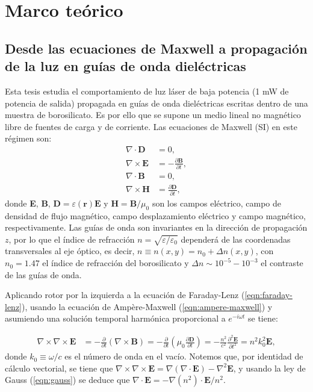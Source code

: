 \chapter{Marco teórico}

\section{Desde las ecuaciones de Maxwell a propagación de la luz en guías de onda dieléctricas}

Esta tesis estudia el comportamiento de luz láser de baja potencia (1 mW de potencia de salida) propagada en guías de onda dieléctricas escritas dentro de una muestra de borosilicato. Es por ello que se supone un medio lineal no magnético libre de fuentes de carga y de corriente. Las ecuaciones de Maxwell (SI) en este régimen son:
\begin{align}
	\nabla\cdot\textbf{D} &= 0, \label{eqn:gauss}
	\\	
	\nabla\times\textbf{E} &= -\frac{\partial \textbf{B}}{\partial t}, \label{eqn:faraday-lenz}
	\\	
	\nabla\cdot\textbf{B} &= 0, \label{eqn:div0}
	\\	
	\nabla\times\textbf{H} &= \frac{\partial \textbf{D}}{\partial t}, \label{eqn:ampere-maxwell}
\end{align}
donde \textbf{E}, \textbf{B}, $\textbf{D}=\varepsilon(\textbf{r})\textbf{E}$ y $\textbf{H}=\textbf{B}/\mu_0$ son los campos eléctrico, campo de densidad de flujo magnético, campo desplazamiento eléctrico y campo magnético, respectivamente. Las guías de onda son invariantes en la dirección de propagación $z$, por lo que el índice de refracción $n=\sqrt{\varepsilon/\varepsilon_0}$ dependerá de las coordenadas transversales al eje óptico, es decir, $n \equiv n(x,y) = n_0 + \Delta n(x,y)$, con $n_0=1.47$ el índice de refracción del borosilicato y $\Delta n \sim 10^{-5}-10^{-3}$ el contraste de las guías de onda.

Aplicando rotor por la izquierda a la ecuación de Faraday-Lenz (\ref{eqn:faraday-lenz}), usando la ecuación de Ampère-Maxwell (\ref{eqn:ampere-maxwell}) y asumiendo una solución temporal harmónica proporcional a $e^{-i\omega t}$ se tiene:

\begin{align}
	\nabla\times\nabla\times\textbf{E} &= -\frac{\partial}{\partial t}(\nabla\times\textbf{B}) = -\frac{\partial}{\partial t}\left(\mu_0\frac{\partial \textbf{D}}{\partial t}\right) = -\frac{n^2}{c^2}\frac{\partial^2 \textbf{E}}{\partial t^2} = n^2k_0^2 \textbf{E}, \label{eqn:rotordoble}
\end{align}
donde $k_0 \equiv \omega/c$ es el número de onda en el vacío. Notemos que, por identidad de cálculo vectorial, se tiene que $\nabla\times\nabla\times\textbf{E} = \nabla(\nabla\cdot\textbf{E}) - \nabla^2\textbf{E}$, y usando la ley de Gauss (\ref{eqn:gauss}) se deduce que $\nabla\cdot \textbf{E} = -\nabla(n^2)\cdot\textbf{E}/n^2$.

